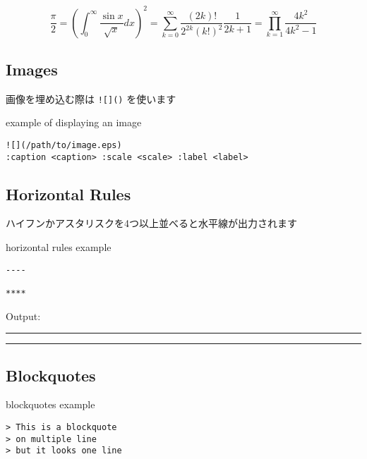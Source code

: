 \documentclass[a4j, titlepage]{jarticle}
\begin{document}
\begin{displaymath}
\frac{\pi}{2}
= \left( \int_{0}^{\infty} \frac{\sin x}{\sqrt{x}} dx \right)^2 
= \sum_{k=0}^{\infty} \frac{(2k)!}{2^{2k}(k!)^2} \frac{1}{2k+1} 
= \prod_{k=1}^{\infty} \frac{4k^2}{4k^2 - 1}
\end{displaymath}

\subsection{Images}

画像を埋め込む際は {\tt ![]()} を使います

\begin{itembox}[c]{example of displaying an image}
\begin{verbatim}
![](/path/to/image.eps)
:caption <caption> :scale <scale> :label <label>
\end{verbatim}
\end{itembox}

\subsection{Horizontal Rules}

ハイフンかアスタリスクを4つ以上並べると水平線が出力されます

\begin{itembox}[c]{horizontal rules example}
\begin{verbatim}
----

****
\end{verbatim}
\end{itembox}

Output:

\begin{center}
\rule{3in}{0.4pt}
\end{center}

\begin{center}
\rule{3in}{0.4pt}
\end{center}

\subsection{Blockquotes}

\begin{itembox}[c]{blockquotes example}
\begin{verbatim}
> This is a blockquote
> on multiple line
> but it looks one line
\end{verbatim}
\end{itembox}
\end{document}
